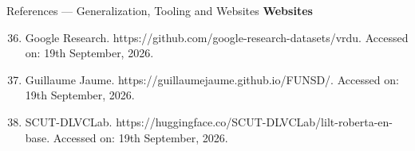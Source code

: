 \documentclass[aspectratio=169, 11pt]{beamer}
\begin{document}
\begin{frame}{References — Generalization, Tooling and Websites}
  \vspace{2pt}
  \textbf{Websites}
  {\setlength{\itemsep}{0pt}\setlength{\topsep}{1pt}\setlength{\parsep}{0pt}
  \begin{enumerate}\setcounter{enumi}{35}
    \item Google Research. https://github.com/google-research-datasets/vrdu. Accessed on: 19th September, 2026.
    \item Guillaume Jaume. https://guillaumejaume.github.io/FUNSD/. Accessed on: 19th September, 2026.
    \item SCUT-DLVCLab. https://huggingface.co/SCUT-DLVCLab/lilt-roberta-en-base. Accessed on: 19th September, 2026.
  \end{enumerate}}
\end{frame}
\end{document}
